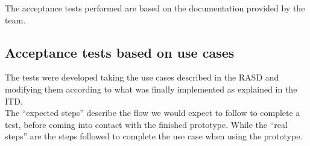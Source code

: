 The acceptance tests performed are based on the documentation provided by the team. \\

\subsection{Acceptance tests based on use cases}
The tests were developed taking the use cases described in the RASD and modifying them according to what was finally implemented as explained in the ITD. \\
The “expected steps” describe the flow we would expect to follow to complete a test, before coming into contact with the finished prototype. While the “real steps” are the steps followed to complete the use case when using the prototype. \\

